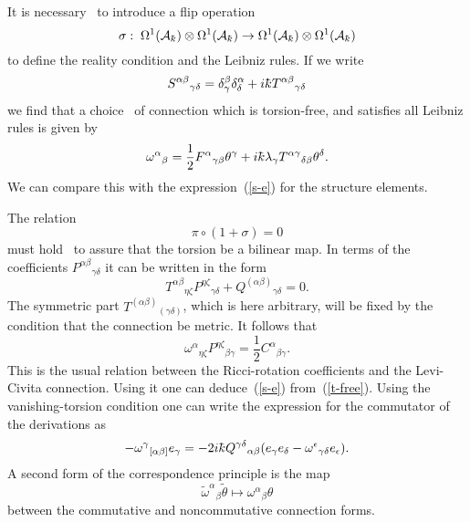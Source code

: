 \documentclass[12pt,a4paper]{article}
\newcounter{eg}
\def\t#1{\tilde #1}
\def\c#1{{\cal #1}}
\def\kbar{{\mathchar'26\mkern-9muk}}
\def\cn#1{\cite{#1}}
\begin{document}
It is necessary~\cite{DubMadMasMou96b} to introduce a flip operation
$$
\sigma:\;\Omega^1(\c{A}_\kbar) \otimes \Omega^1(\c{A}_\kbar) \rightarrow
\Omega^1(\c{A}_\kbar) \otimes \Omega^1(\c{A}_\kbar)
$$
to define the reality condition and the Leibniz rules.  If we write
$$
S^{\alpha\beta}{}_{\gamma\delta} = \delta^\beta_\gamma \delta^\alpha_\delta
+ i\kbar T^{\alpha\beta}{}_{\gamma\delta}
$$
we find that a choice~\cn{DimMad96} of connection which is
torsion-free, and satisfies all Leibniz rules is given by
\begin{equation}
\omega^\alpha{}_{\beta} = \frac 12 F^\alpha{}_{\gamma\beta} \theta^\gamma
+ i\kbar \lambda_\gamma T^{\alpha\gamma}{}_{\delta\beta}\theta^\delta.
                                                               \label{t-free}
\end{equation}
We can compare this with the expression~(\ref{s-e}) for the structure
elements.  

The relation
$$
\pi \circ (1 + \sigma) = 0
$$
must hold~\cn{DimMad96,MadMou98} to assure that the torsion be a
bilinear map. In terms of the coefficients
$P^{\alpha\beta}{}_{\gamma\delta}$ it can be written in the form
$$
T^{\alpha\beta}{}_{\eta\zeta} P^{\eta\zeta}{}_{\gamma\delta} +  
Q^{(\alpha\beta)}{}_{\gamma\delta} = 0.  
$$
The symmetric part $T^{(\alpha\beta)}{}_{(\gamma\delta)}$, which is here 
arbitrary, will be fixed by the condition that the connection be metric.
It follows that
\begin{equation}
\omega^\alpha{}_{\eta\zeta}P^{\eta\zeta}{}_{\beta\gamma} =
\frac 12 C^\alpha{}_{\beta\gamma}.                     \label{T0}
\end{equation}
This is the usual relation between the Ricci-rotation coefficients
and the Levi-Civita connection. Using it one can deduce~(\ref{s-e})
from~(\ref{t-free}).  Using the vanishing-torsion condition one can
write the expression for the commutator of the derivations as
\begin{equation}
[e_\alpha, e_\beta] - \omega^\gamma{}_{[\alpha\beta]} e_\gamma = 
- 2i\kbar Q^{\gamma\delta}{}_{\alpha\beta} 
(e_{\gamma} e_{\delta} - \omega^\epsilon{}_{\gamma\delta} e_\epsilon).
                                                         \label{consis3}
\end{equation}
A second form of the correspondence principle is the map
\begin{equation}
\t{\omega}^\alpha{}_{\beta} \t{\theta} \mapsto 
\omega^\alpha{}_{\beta} \theta                             \label{cp2}
\end{equation}
between the commutative and noncommutative connection forms.
\end{document}
